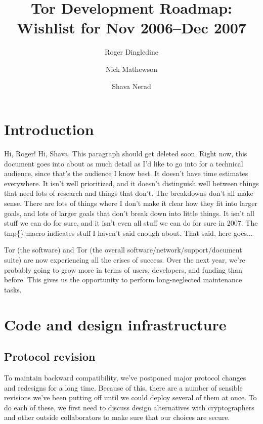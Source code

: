 \documentclass{article}
\begin{document}
\title{Tor Development Roadmap: Wishlist for Nov 2006--Dec 2007}
\author{Roger Dingledine \and Nick Mathewson \and Shava Nerad}

\maketitle
\pagestyle{plain}

\section{Introduction}
Hi, Roger!  Hi, Shava.  This paragraph should get deleted soon.  Right now,
this document goes into about as much detail as I'd like to go into for a
technical audience, since that's the audience I know best.  It doesn't have
time estimates everywhere.  It isn't well prioritized, and it doesn't
distinguish well between things that need lots of research and things that
don't.  The breakdowns don't all make sense.  There are lots of things where
I don't make it clear how they fit into larger goals, and lots of larger
goals that don't break down into little things. It isn't all stuff we can do
for sure, and it isn't even all stuff we can do for sure in 2007.  The
tmp\{\} macro indicates stuff I haven't said enough about.  That said, here
goes...

Tor (the software) and Tor (the overall software/network/support/document
suite) are now experiencing all the crises of success.  Over the next year,
we're probably going to grow more in terms of users, developers, and funding
than before.  This gives us the opportunity to perform long-neglected
maintenance tasks.

\section{Code and design infrastructure}

\subsection{Protocol revision}
To maintain backward compatibility, we've postponed major protocol
changes and redesigns for a long time.  Because of this, there are a number
of sensible revisions we've been putting off until we could deploy several of
them at once.  To do each of these, we first need to discuss design
alternatives with cryptographers and other outside collaborators to
make sure that our choices are secure.
\end{document}
